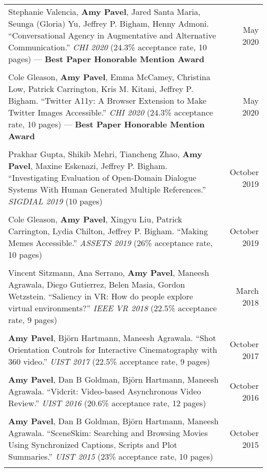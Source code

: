 \begin{longtable}{Xr}
	Stephanie Valencia, \textbf{Amy Pavel}, Jared Santa Maria, Seunga (Gloria) Yu, Jeffrey P. Bigham, Henny Admoni. ``Conversational Agency in Augmentative and Alternative Communication.'' \textit{CHI 2020} (24.3\% acceptance rate, 10 pages) --- \textbf{Best Paper Honorable Mention Award} & May 2020 \\
	\\

	Cole Gleason, \textbf{Amy Pavel}, Emma McCamey, Christina Low, Patrick Carrington, Kris M. Kitani, Jeffrey P. Bigham. ``Twitter A11y: A Browser Extension to Make Twitter Images Accessible.'' \textit{CHI 2020} (24.3\% acceptance rate, 10 pages) --- \textbf{Best Paper Honorable Mention Award} & May 2020 \\
	\\

	Prakhar Gupta, Shikib Mehri, Tiancheng Zhao, \textbf{Amy Pavel}, Maxine Eskenazi, Jeffrey P. Bigham. ``Investigating Evaluation of Open-Domain Dialogue Systems With Human Generated Multiple References.'' \textit{SIGDIAL 2019} (10 pages) & October 2019 \\
	\\

	Cole Gleason, \textbf{Amy Pavel}, Xingyu Liu, Patrick Carrington, Lydia Chilton, Jeffrey P. Bigham. ``Making Memes Accessible.'' \textit{ASSETS 2019} (26\% acceptance rate, 10 pages) & October 2019 \\
	\\

	Vincent Sitzmann, Ana Serrano, \textbf{Amy Pavel}, Maneesh Agrawala, Diego Gutierrez, Belen Masia, Gordon Wetzstein. ``Saliency in VR: How do people explore virtual environments?'' \textit{IEEE VR 2018} (22.5\% acceptance rate, 9 pages) & March 2018 \\
	\\

	\textbf{Amy Pavel}, Björn Hartmann, Maneesh Agrawala. ``Shot Orientation Controls for Interactive Cinematography with 360 video.'' \textit{UIST 2017} (22.5\% acceptance rate, 9 pages) & October 2017 \\
	\\

	\textbf{Amy Pavel}, Dan B Goldman, Björn Hartmann, Maneesh Agrawala. ``Vidcrit: Video-based Asynchronous Video Review.'' \textit{UIST 2016} (20.6\% acceptance rate, 12 pages) & October 2016 \\
	\\

	\textbf{Amy Pavel}, Dan B Goldman, Björn Hartmann, Maneesh Agrawala. ``SceneSkim: Searching and Browsing Movies Using Synchronized Captions, Scripts and Plot Summaries.'' \textit{UIST 2015} (23\% acceptance rate, 10 pages) & October 2015 \\
	\\


\end{longtable}
